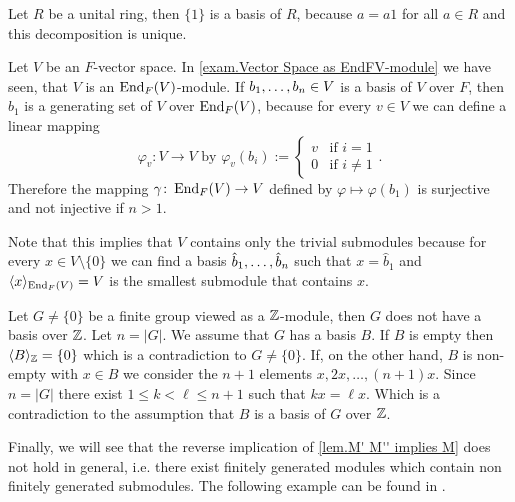 \begin{exam}\label{exam.Bases of Modules}
\begin{exlist}
\item Let $R$ be a unital ring, then $\lbrace 1\rbrace$ is a basis of $R$, because $a=a1$ for all $a\in R$ and this decomposition is unique.
\item Let $V$ be an $F$-vector space. In \cref{exam.Vector Space as EndFV-module} we have seen, that $V$ is an $\operatorname{\mathrm{End}}_F(V)$-module. If $b_{1},\ldots,b_{n}\in V$ is a basis of $V$ over $F$, then $b_1$ is a generating set of $V$ over $\operatorname{\mathrm{End}}_F(V)$, because for every $v\in V$ we can define a linear mapping 
\begin{equation*}
\varphi_v\colon V\to V \text{ by } \varphi_v(b_i):= \begin{cases}v & \text{if } i=1\\ 0 & \text{if } i\neq 1\end{cases}.
\end{equation*}
Therefore the mapping $\gamma\colon \operatorname{\mathrm{End}}_F(V)\to V$ defined by $\varphi\mapsto \varphi(b_1)$ is surjective and not injective if $n>1$.

Note that this implies that $V$ contains only the trivial submodules because for every $x\in V\setminus\lbrace 0\rbrace$ we can find a basis $\hat{b}_{1},\ldots,\hat{b}_{n}$ such that $x=\hat{b}_1$ and $\langle x\rangle_{\operatorname{\mathrm{End}}_F(V)}=V$ is the smallest submodule that contains $x$. \label{exam. Generating set of V over EndFV}
\item Let $G\neq\lbrace 0\rbrace$ be a finite group viewed as a $\operatorname{\mathbb{Z}}$-module, then $G$ does not have a basis over $\operatorname{\mathbb{Z}}$. Let $n=|G|$. We assume that $G$ has a basis $B$. If $B$ is empty then $\langle B\rangle_{\operatorname{\mathbb{Z}}} =\lbrace 0\rbrace$ which is a contradiction to $G\neq\lbrace 0\rbrace$. If, on the other hand, $B$ is non-empty with $x\in B$ we consider the $n+1$ elements $x,2x,\ldots,(n+1)x$. Since $n=| G|$ there exist $1\leq k<\ell\leq n+1$ such that $kx=\ell x$. Which is a contradiction to the assumption that $B$ is a basis of $G$ over $\operatorname{\mathbb{Z}}$.\label{exam.basis of G}
\end{exlist}
\end{exam}

Finally, we will see that the reverse implication of \cref{lem.M' M'' implies M} does not hold in general, i.e. there exist finitely generated modules which contain non finitely generated submodules. The following example can be found in \cite[p.197]{jantzen2005algebra}.

